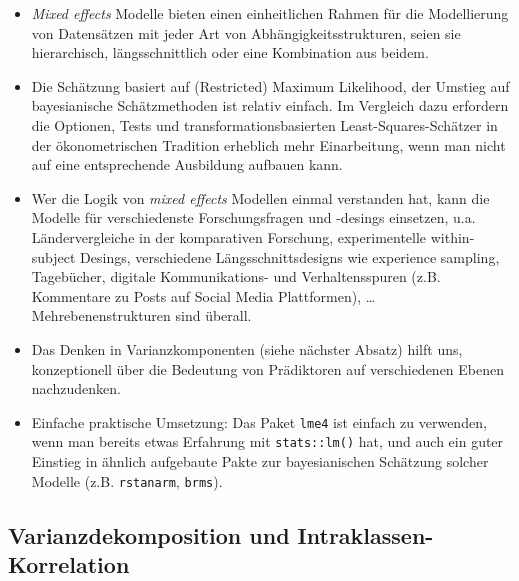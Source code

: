 \documentclass[
]{book}
\begin{document}
\begin{itemize}
\item
  \emph{Mixed effects} Modelle bieten einen einheitlichen Rahmen für die Modellierung von Datensätzen mit jeder Art von Abhängigkeitsstrukturen, seien sie hierarchisch, längsschnittlich oder eine Kombination aus beidem.
\item
  Die Schätzung basiert auf (Restricted) Maximum Likelihood, der Umstieg auf bayesianische Schätzmethoden ist relativ einfach. Im Vergleich dazu erfordern die Optionen, Tests und transformationsbasierten Least-Squares-Schätzer in der ökonometrischen Tradition erheblich mehr Einarbeitung, wenn man nicht auf eine entsprechende Ausbildung aufbauen kann.
\item
  Wer die Logik von \emph{mixed effects} Modellen einmal verstanden hat, kann die Modelle für verschiedenste Forschungsfragen und -desings einsetzen, u.a. Ländervergleiche in der komparativen Forschung, experimentelle within-subject Desings, verschiedene Längsschnittsdesigns wie experience sampling, Tagebücher, digitale Kommunikations- und Verhaltensspuren (z.B. Kommentare zu Posts auf Social Media Plattformen), \ldots{} Mehrebenenstrukturen sind überall.
\item
  Das Denken in Varianzkomponenten (siehe nächster Absatz) hilft uns, konzeptionell über die Bedeutung von Prädiktoren auf verschiedenen Ebenen nachzudenken.
\item
  Einfache praktische Umsetzung: Das Paket \texttt{lme4} ist einfach zu verwenden, wenn man bereits etwas Erfahrung mit \texttt{stats::lm()} hat, und auch ein guter Einstieg in ähnlich aufgebaute Pakte zur bayesianischen Schätzung solcher Modelle (z.B. \texttt{rstanarm}, \texttt{brms}).
\end{itemize}

\hypertarget{varianzdekomposition-und-intraklassen-korrelation}{%
\subsection*{Varianzdekomposition und Intraklassen-Korrelation}\label{varianzdekomposition-und-intraklassen-korrelation}}
\end{document}
